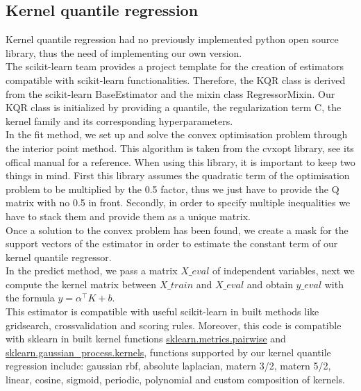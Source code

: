 \subsection{Kernel quantile regression}
Kernel quantile regression had no previously implemented python open source library, thus the need of implementing our own version.
\\
The scikit-learn team provides a project template for the creation of estimators compatible with scikit-learn functionalities. Therefore, the KQR class is derived from the scikit-learn BaseEstimator and the mixin class RegressorMixin.
Our KQR class is initialized by providing a quantile, the regularization term C, the kernel family and its corresponding hyperparameters.
\\
In the fit method, we set up and solve the convex optimisation problem through the interior point method. This algorithm is taken from the cvxopt library, see its offical manual  for a reference.
When using this library, it is important to keep two things in mind. First this library assumes the quadratic term of the optimisation problem to be multiplied by the 0.5 factor, thus we just have to provide the Q matrix with no 0.5 in front.
Secondly, in order to specify multiple inequalities we have to stack them and provide them as a unique matrix.
\\
Once a solution to the convex problem has been found, we create a mask for the support vectors of the estimator in order to estimate the constant term of our kernel quantile regressor.
\\
In the predict method, we pass a matrix $X\_eval$ of independent variables, next we compute the kernel matrix between $X\_train$ and $X\_eval$ and obtain $y\_eval$ with the formula $y=\alpha^\intercal K+b$.
\\
This estimator is compatible with useful scikit-learn in built methods like gridsearch, crossvalidation and scoring rules. Moreover, this code is compatible with sklearn in built kernel functions \href{https://scikit-learn.org/stable/modules/classes.html#module-sklearn.metrics.pairwise}{sklearn.metrics.pairwise} and \href{https://scikit-learn.org/stable/modules/classes.html#module-sklearn.gaussian_process.kernels}{sklearn.gaussian\_process.kernels}, functions supported by our kernel quantile regression include: gaussian rbf, absolute laplacian, matern 3/2, matern 5/2, linear, cosine, sigmoid, periodic, polynomial and custom composition of kernels.


